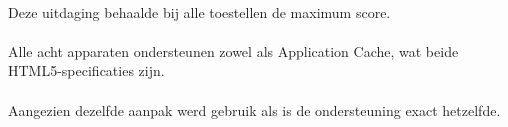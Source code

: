 \paragraph{\kendo} 
Deze uitdaging behaalde bij alle toestellen de maximum score.

\paragraph{\jqm} 
Alle acht apparaten ondersteunen zowel  als Application Cache, wat beide HTML5-specificaties zijn.

\paragraph{\lungo} 
Aangezien dezelfde aanpak werd gebruik als \jqm{} is de ondersteuning exact hetzelfde.